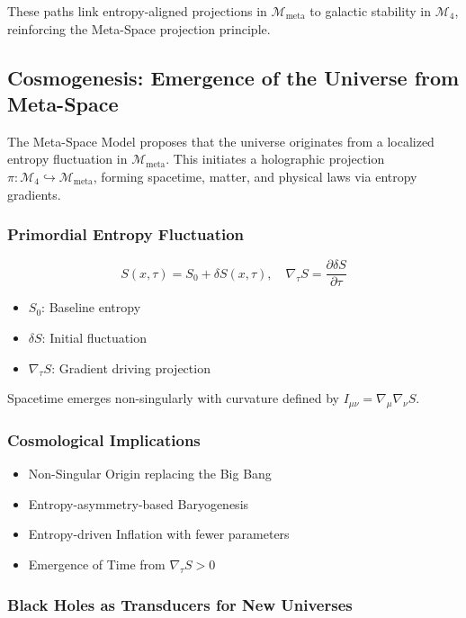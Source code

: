 \documentclass[10.5pt,a4paper]{article}
\begin{document}
These paths link entropy-aligned projections in \(\mathcal{M}_{\text{meta}}\) to galactic stability in \(\mathcal{M}_4\), reinforcing the Meta-Space projection principle.

\subsection{Cosmogenesis: Emergence of the Universe from Meta-Space}

The Meta-Space Model proposes that the universe originates from a localized entropy fluctuation in \(\mathcal{M}_{\text{meta}}\). This initiates a holographic projection \(\pi: \mathcal{M}_4 \hookrightarrow \mathcal{M}_{\text{meta}}\), forming spacetime, matter, and physical laws via entropy gradients.

\subsubsection{Primordial Entropy Fluctuation}

\[
S(x, \tau) = S_0 + \delta S(x, \tau), \quad \nabla_\tau S = \frac{\partial \delta S}{\partial \tau}
\]

\begin{itemize}
    \item \(S_0\): Baseline entropy
    \item \(\delta S\): Initial fluctuation
    \item \(\nabla_\tau S\): Gradient driving projection
\end{itemize}

Spacetime emerges non-singularly with curvature defined by \(I_{\mu\nu} = \nabla_\mu \nabla_\nu S\).

\subsubsection{Cosmological Implications}

\begin{itemize}
    \item Non-Singular Origin replacing the Big Bang
    \item Entropy-asymmetry-based Baryogenesis
    \item Entropy-driven Inflation with fewer parameters
    \item Emergence of Time from \(\nabla_\tau S > 0\)
\end{itemize}

\subsubsection{Black Holes as Transducers for New Universes}
\end{document}
